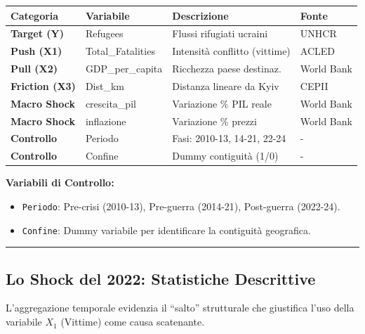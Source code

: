 \documentclass[
  letterpaper,
  DIV=11,
  numbers=noendperiod]{scrartcl}
\begin{document}
\begin{table}[!h]
\centering\begingroup\fontsize{6}{8}\selectfont

\begin{tabular}{>{}llll}
\toprule
Categoria & Variabile & Descrizione & Fonte\\
\midrule
\textbf{Target (Y)} & Refugees & Flussi rifugiati ucraini & UNHCR\\
\textbf{Push (X1)} & Total\_Fatalities & Intensità conflitto (vittime) & ACLED\\
\textbf{Pull (X2)} & GDP\_per\_capita & Ricchezza paese destinaz. & World Bank\\
\textbf{Friction (X3)} & Dist\_km & Distanza lineare da Kyiv & CEPII\\
\textbf{Macro Shock} & crescita\_pil & Variazione \% PIL reale & World Bank\\
\addlinespace
\textbf{Macro Shock} & inflazione & Variazione \% prezzi & World Bank\\
\textbf{Controllo} & Periodo & Fasi: 2010-13, 14-21, 22-24 & -\\
\textbf{Controllo} & Confine & Dummy contiguità (1/0) & -\\
\bottomrule
\end{tabular}
\endgroup{}
\end{table}

\textbf{Variabili di Controllo:}

\begin{itemize}
\item
  \texttt{Periodo}: Pre-crisi (2010-13), Pre-guerra (2014-21),
  Post-guerra (2022-24).
\item
  \texttt{Confine}: Dummy variabile per identificare la contiguità
  geografica.
\end{itemize}

\begin{center}\rule{0.5\linewidth}{0.5pt}\end{center}

\subsection{Lo Shock del 2022: Statistiche
Descrittive}\label{lo-shock-del-2022-statistiche-descrittive}

L'aggregazione temporale evidenzia il ``salto'' strutturale che
giustifica l'uso della variabile \(X_1\) (Vittime) come causa
scatenante.
\end{document}
